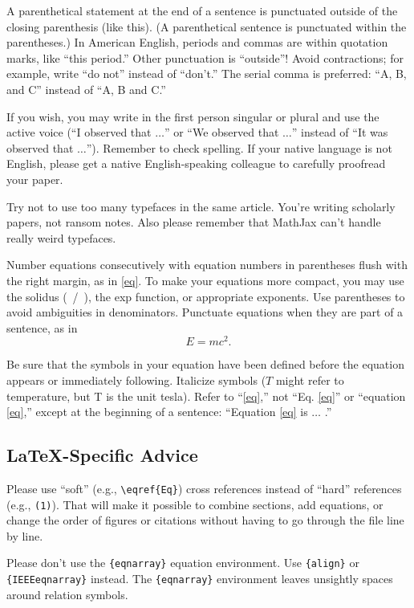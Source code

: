 \documentclass[journal,twoside,web]{ieeecolor2}
\begin{document}
A parenthetical statement at the end of a sentence is punctuated outside of 
the closing parenthesis (like this). (A parenthetical sentence is punctuated 
within the parentheses.) In American English, periods and commas are within 
quotation marks, like ``this period.'' Other punctuation is ``outside''! 
Avoid contractions; for example, write ``do not'' instead of ``don't.'' The 
serial comma is preferred: ``A, B, and C'' instead of ``A, B and C.''

If you wish, you may write in the first person singular or plural and use 
the active voice (``I observed that $\ldots$'' or ``We observed that $\ldots$'' 
instead of ``It was observed that $\ldots$''). Remember to check spelling. If 
your native language is not English, please get a native English-speaking 
colleague to carefully proofread your paper.

Try not to use too many typefaces in the same article. You're writing
scholarly papers, not ransom notes. Also please remember that MathJax
can't handle really weird typefaces.

Number equations consecutively with equation numbers in parentheses flush 
with the right margin, as in \eqref{eq}. To make your equations more 
compact, you may use the solidus (~/~), the exp function, or appropriate 
exponents. Use parentheses to avoid ambiguities in denominators. Punctuate 
equations when they are part of a sentence, as in
\begin{equation}E=mc^2.\label{eq}\end{equation}

Be sure that the symbols in your equation have been defined before the 
equation appears or immediately following. Italicize symbols ($T$ might refer 
to temperature, but T is the unit tesla). Refer to ``\eqref{eq},'' not ``Eq. \eqref{eq}'' 
or ``equation \eqref{eq},'' except at the beginning of a sentence: ``Equation \eqref{eq} 
is $\ldots$ .''

\subsection{\LaTeX-Specific Advice}

Please use ``soft'' (e.g., \verb|\eqref{Eq}|) cross references instead
of ``hard'' references (e.g., \verb|(1)|). That will make it possible
to combine sections, add equations, or change the order of figures or
citations without having to go through the file line by line.

Please don't use the \verb|{eqnarray}| equation environment. Use
\verb|{align}| or \verb|{IEEEeqnarray}| instead. The \verb|{eqnarray}|
environment leaves unsightly spaces around relation symbols.
\end{document}
